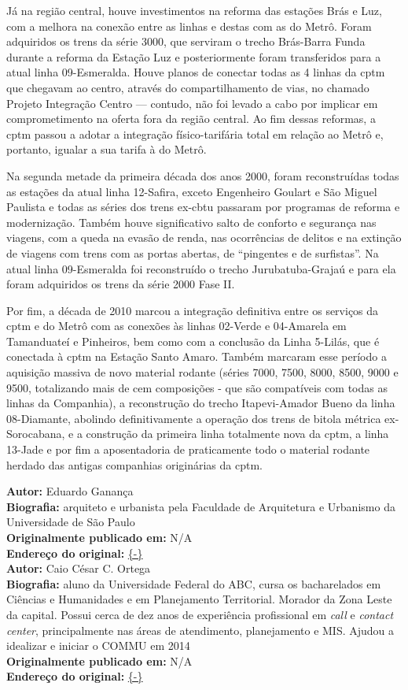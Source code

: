 \documentclass[11pt,fleqn]{book} %
\newcommand{\infocaio}[2]{\textbf{Autor:} Caio C\'{e}sar C. Ortega \\ \textbf{Biografia:} aluno da Universidade Federal do ABC, cursa os bacharelados em Ci\^{e}ncias e Humanidades e em Planejamento Territorial. Morador da Zona Leste da capital. Possui cerca de dez anos de experi\^{e}ncia profissional em \textit{call} e \textit{contact center}, principalmente nas \'{a}reas de atendimento, planejamento e MIS. Ajudou a idealizar e iniciar o COMMU em 2014 \\ \textbf{Originalmente publicado em:} {#1} \\ \textbf{Endere\c{c}o do original:} \url{{#2}}}
\newcommand{\infoedu}[2]{\textbf{Autor:} Eduardo Ganan\c{c}a \\ \textbf{Biografia:} arquiteto e urbanista pela Faculdade de Arquitetura e Urbanismo da Universidade de S\~{a}o Paulo \\ \textbf{Originalmente publicado em:} {#1} \\ \textbf{Endere\c{c}o do original:} \url{{#2}}}
\begin{document}

Já na região central, houve investimentos na reforma das estações Brás e Luz, com a melhora na conexão entre as linhas e destas com as do Metrô. Foram adquiridos os trens da série 3000, que serviram o trecho Brás-Barra Funda durante a reforma da Estação Luz e posteriormente foram transferidos para a atual linha 09-Esmeralda. Houve planos de conectar todas as 4 linhas da \gls{cptm} que chegavam ao centro, através do compartilhamento de vias, no chamado Projeto Integração Centro --- contudo, não foi levado a cabo por implicar em comprometimento na oferta fora da região central. Ao fim dessas reformas, a \gls{cptm} passou a adotar a integração físico-tarifária total em relação ao Metrô e, portanto, igualar a sua tarifa à do Metrô. 


Na segunda metade da primeira década dos anos 2000, foram reconstruídas todas as estações da atual linha 12-Safira, exceto Engenheiro Goulart e São Miguel Paulista e todas as séries dos trens ex-\gls{cbtu} passaram por programas de reforma e modernização. Também houve significativo salto de conforto e segurança nas viagens, com a queda na evasão de renda, nas ocorrências de delitos e na extinção de viagens com trens com as portas abertas, de \enquote{pingentes e de surfistas}. Na atual linha 09-Esmeralda foi reconstruído o trecho Jurubatuba-Grajaú e para ela foram adquiridos os trens da série 2000 Fase II.

Por fim, a década de 2010 marcou a integração definitiva entre os serviços da \gls{cptm} e do Metrô com as conexões às linhas 02-Verde e 04-Amarela em Tamanduateí e Pinheiros, bem como com a conclusão da Linha 5-Lilás, que é conectada à \gls{cptm} na Estação Santo Amaro. Também marcaram esse período a aquisição massiva de novo material rodante (séries 7000, 7500, 8000, 8500, 9000 e 9500, totalizando mais de cem composições - que são compatíveis com todas as linhas da Companhia), a reconstrução do trecho Itapevi-Amador Bueno da linha 08-Diamante, abolindo definitivamente a operação dos trens de bitola métrica ex-Sorocabana, e a construção da primeira linha totalmente nova da \gls{cptm}, a linha 13-Jade e por fim a aposentadoria de praticamente todo o material rodante herdado das antigas companhias originárias da \gls{cptm}.


\begin{info}
	\infoedu{N/A}{-}
	\\
	\infocaio{N/A}{-}
\end{info}
\end{document}
